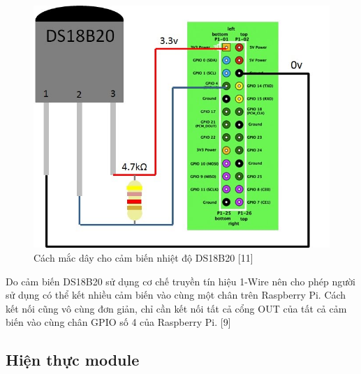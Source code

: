 \documentclass[11pt,a4paper,oneside]{book}
\begin{document}
\begin{figure}[h]
  \centering
     \includegraphics[scale=0.3]{6-temp-sensor}
  \caption{Cách mắc dây cho cảm biến nhiệt độ DS18B20 [11]}\label{fig:6-temp-sensor}
\end{figure}

Do cảm biến DS18B20 sử dụng cơ chế truyền tín hiệu 1-Wire nên cho phép người sử dụng có thể kết nhiều cảm biến vào cùng một chân trên Raspberry Pi. Cách kết nối cũng vô cùng đơn giản, chỉ cần kết nối tất cả cổng OUT của tất cả cảm biến vào cùng chân GPIO số 4 của Raspberry Pi. [9]

\subsection{Hiện thực module}
\end{document}
